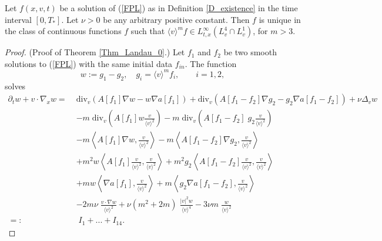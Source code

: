 \documentclass[10pt,a4paper]{amsart}
\begin{document}
\begin{theorem} \label{Thm_Landau_0}
Let $f(x,v,t)$ be a solution of (\ref{FPL}) as in Definition \ref{D_existence} in the time interval $[0,T_\ast]$. Let $\nu >0$ be any arbitrary positive constant. Then $f$ is unique in the class of continuous functions $f$ such that  $ \langle v \rangle ^m f \in  L^\infty_{t,x}(L^4_v \cap L^1_v)$, for  $m > 3$. 
\end{theorem}

\begin{proof} (Proof of Theorem \ref{Thm_Landau_0}.)
Let $f_1$ and $f_2$ be two smooth solutions to (\ref{FPL}) with the same initial data $f_{in}$.  The function 
$$
w := g_1-g_2, \quad g_i = \langle v \rangle ^m f_i,
\qquad i = 1, 2,
$$ 
solves
\begin{align*}%
\partial_t w + v \cdot \nabla_x w = \;&\textrm{div}_v \left( A[f_1] \nabla w - w \nabla a[f_1]\right)+\textrm{div}_v \left( A[f_1-f_2] \nabla g_2 - g_2 \nabla a[f_1-f_2]\right)  +\nu \Delta_v w  \nonumber \\
&-m\; \textrm{div}_v \left( A[f_1]w \frac{v}{ \langle v \rangle ^2}\right)-m\; \textrm{div}_v \left( A[f_1-f_2]\; g_2 \frac{v}{ \langle v \rangle ^2}\right) \nonumber \\
&- m \left  \langle A[f_1]   \nabla w ,  \frac{v}{ \langle v \rangle ^2}\right  \rangle - m \left  \langle A[f_1-f_2]   \nabla g_2 ,  \frac{v}{ \langle v \rangle ^2}\right  \rangle \nonumber \\
& +m^2 w \left \langle A[f_1]  \frac{v}{ \langle v \rangle ^2}  ,  \frac{v}{ \langle v \rangle ^2}\right  \rangle +m^2 g_2 \left \langle A[f_1-f_2]  \frac{v}{ \langle v \rangle ^2}  ,  \frac{v}{ \langle v \rangle ^2}\right  \rangle  \nonumber \\
& + m w \left \langle  \nabla a[f_1],  \frac{v}{ \langle v \rangle ^2}\right  \rangle  + m \left \langle g_2 \nabla a[f_1-f_2],  \frac{v}{ \langle v \rangle ^2}\right  \rangle \nonumber  \\
&- 2m \nu  \;\frac{v \cdot \nabla w }{\langle v \rangle ^2} +\nu  (m^2+2m)\; \frac{|v|^2w }{\langle v \rangle ^4} -3\nu m \; \frac{ w }{\langle v \rangle ^2} \nonumber\\
=:&\; I_1 + ...+ I_{14}.
\end{align*}


\end{proof}
\end{document}
